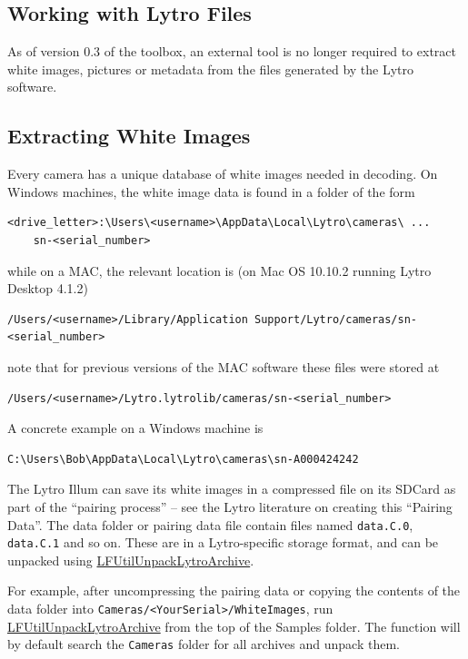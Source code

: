 \documentclass[onecolumn]{article}
\newcommand{\CiteFunction}[1]{\hyperlink{#1}{\small #1}}
\newcommand{\SymbolText}[1]{\texttt{\small #1}}
\begin{document}
\begin{appendices}
\newpage
\section{Working with Lytro Files}
\label{sect_LytroFiles}

As of version 0.3 of the toolbox, an external tool is no longer required to extract white images, pictures or metadata from the files generated by the Lytro software. 

\subsection{Extracting White Images}
\label{sect_LytroFiles_Cal}

Every camera has a unique database of white images needed in decoding.  On Windows machines, the white image data is found in a folder of the form
\begin{Verbatim} 
<drive_letter>:\Users\<username>\AppData\Local\Lytro\cameras\ ...
    sn-<serial_number>
\end{Verbatim}

while on a MAC, the relevant location is (on Mac OS 10.10.2 running Lytro Desktop 4.1.2)
\begin{Verbatim} 
/Users/<username>/Library/Application Support/Lytro/cameras/sn-<serial_number>
\end{Verbatim}

note that for previous versions of the MAC software these files were stored at
\begin{Verbatim} 
/Users/<username>/Lytro.lytrolib/cameras/sn-<serial_number>
\end{Verbatim}

A concrete example on a Windows machine is
\begin{Verbatim} 
C:\Users\Bob\AppData\Local\Lytro\cameras\sn-A000424242
\end{Verbatim}

The Lytro Illum can save its white images in a compressed file on its SDCard as part of the ``pairing process'' -- see the Lytro literature on creating this ``Pairing Data''.  The data folder or pairing data file contain files named \SymbolText{data.C.0}, \SymbolText{data.C.1} and so on. These are in a Lytro-specific storage format, and can be unpacked using \CiteFunction{LFUtilUnpackLytroArchive}.  

For example, after uncompressing the pairing data or copying the contents of the data folder into \SymbolText{Cameras/<YourSerial>/WhiteImages}, run \CiteFunction{LFUtilUnpackLytroArchive} from the top of the Samples folder.  The function will by default search the \SymbolText{Cameras} folder for all archives and unpack them.


\end{appendices}
\end{document}
